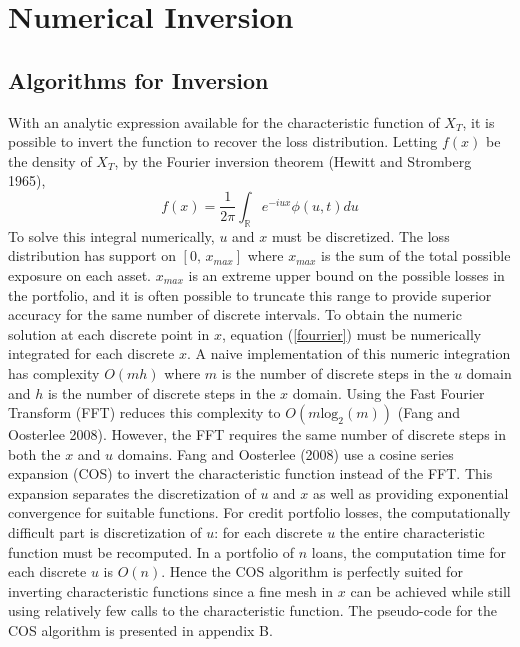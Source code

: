 \documentclass[12pt]{article}
\theoremstyle{definition}
\begin{document}
\section{Numerical Inversion}
\subsection{Algorithms for Inversion}
With an analytic expression available for the characteristic function of \(X_T\), it is possible to invert the function to recover the loss distribution.  Letting \(f(x)\) be the density of \(X_T\), by the Fourier inversion theorem (Hewitt and Stromberg 1965), \begin{equation}f(x)=\frac{1}{2\pi}\int_{\mathbb{R}} e^{-iux} \phi(u, t) du \label{fourrier}\end{equation}
To solve this integral numerically, \(u\) and \(x\) must be discretized.  The loss distribution has support on \([0,\,x_{max}]\) where \(x_{max}\) is the sum of the total possible exposure on each asset.  \(x_{max}\) is an extreme upper bound on the possible losses in the portfolio, and it is often possible to truncate this range to provide superior accuracy for the same number of discrete intervals.  To obtain the numeric solution at each discrete point in \(x\), equation (\ref{fourrier}) must be numerically integrated for each discrete \(x\).  A naive implementation of this numeric integration has complexity \(O(mh)\) where \(m\) is the number of discrete steps in the \(u\) domain and \(h\) is the number of discrete steps in the \(x\) domain.  Using the  Fast Fourier Transform (FFT) reduces this complexity to \(O(m\mathrm{log}_2 (m))\) (Fang and Oosterlee 2008).  However, the FFT requires the same number of discrete steps in both the \(x\) and \(u\) domains.  Fang and Oosterlee (2008) use a cosine series expansion (COS) to invert the characteristic function instead of the FFT.  This expansion separates the discretization of \(u\) and \(x\) as well as providing exponential convergence for suitable functions.  For credit portfolio losses, the computationally difficult part is discretization of \(u\):  for each discrete \(u\) the entire characteristic function must be recomputed.  In a portfolio of \(n\) loans, the computation time for each discrete \(u\) is \(O(n)\). Hence the COS algorithm is perfectly suited for inverting characteristic functions since a fine mesh in \(x\) can be achieved while still using relatively few calls to the characteristic function.  The pseudo-code for the COS algorithm is presented in appendix B.
\\
\end{document}
